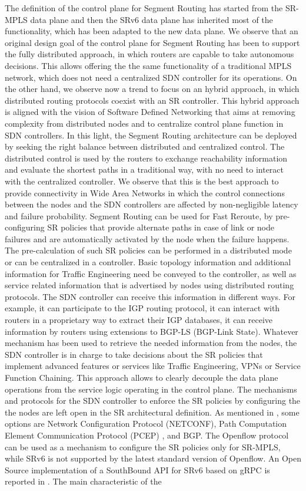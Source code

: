 The definition of the control plane for Segment Routing has started from the SR-MPLS data plane and then the SRv6 data plane has inherited most of the functionality, which has been adapted to the new data plane. We observe that an original design goal of the control plane for Segment Routing has been to support the fully distributed approach, in which routers are capable to take autonomous decisions. This allows offering the the same functionality of a traditional MPLS network, which does not need a centralized SDN controller for its operations. On the other hand, we observe now a trend to focus on an hybrid approach, in which distributed routing protocols coexist with an SR controller. This hybrid approach is aligned with the vision of Software Defined Networking that aims at removing complexity from distributed nodes and to centralize control plane function in SDN controllers. In this light, the Segment Routing architecture can be deployed by seeking the right balance between distributed and centralized control. The distributed control is used by the routers to exchange reachability information and evaluate the shortest paths in a traditional way, with no need to interact with the centralized controller. We observe that this is the best approach to provide connectivity in Wide Area Networks in which the control connections between the nodes and the SDN controllers are affected by non-negligible latency and failure probability. Segment Routing can be used for Fast Reroute, by pre-configuring SR policies that provide alternate paths in case of link or node failures and are automatically activated by the node when the failure happens. The pre-calculation of such SR policies can be performed in a distributed mode or can be centralized in a controller. Basic topology information and additional information for Traffic Engineering need be conveyed to the controller, as well as service related information that is advertised by nodes using distributed routing protocols. The SDN controller can receive this information in different ways. For example, it can participate to the IGP routing protocol, it can interact with routers in a proprietary way to extract their IGP databases, it can receive information by routers using extensions to BGP-LS (BGP-Link State). Whatever mechanism has been used to retrieve the needed information from the nodes, the SDN controller is in charge to take decisions about the SR policies that implement advanced features or services like Traffic Engineering, VPNs or Service Function Chaining. This approach allows to clearly decouple the data plane operations from the service logic operating in the control plane. The mechanisms and protocols for the SDN controller to enforce the SR policies by configuring the the nodes are left open in the SR architectural definition. As mentioned in \cite{rfc8402}, some options are Network Configuration Protocol (NETCONF), Path Computation Element Communication Protocol (PCEP) \cite{ietf-pce-segment-routing}, and BGP. The Openflow protocol can be used as a mechanism to configure the SR policies only for SR-MPLS, while SRv6 is not supported by the latest standard version of Openflow. An Open Source implementation of a SouthBound API for SRv6 based on gRPC is reported in \cite{ventre2018sdn}. The main characteristic of the 